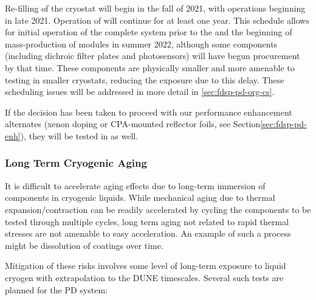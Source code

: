 Re-filling of the  cryostat will begin in the fall of 2021, with operations beginning in late 2021.  Operation of  will continue for at least one year.  This schedule allows for initial operation of the complete system prior to the   and the beginning of mass-production of  modules in summer 2022, although some components (including dichroic filter plates and photosensors) will have begun procurement by that time.  These components are physically smaller and more amenable to testing in smaller cryostats, reducing the exposure due to this delay.  These scheduling issues will be addressed in more detail in \ref{sec:fdsp-pd-org-cs}.

If the decision has been taken to proceed with our performance enhancement alternates (xenon doping or CPA-mounted reflector foils, see Section\ref{sec:fdsp-pd-enh}), they will be tested in  as well.

\subsubsection{Long Term Cryogenic Aging}
\label{sec:valid-longtermaging}

It is difficult to accelerate aging effects due to long-term immersion of components in cryogenic liquids.  While mechanical aging due to thermal expansion/contraction can be readily accelerated by cycling the components to be tested through multiple cycles, long term aging not related to rapid thermal stresses are not amenable to easy acceleration.  An example of such a process might be dissolution of  coatings over time.

Mitigation of these risks involves some level of long-term exposure to liquid cryogen with extrapolation to the DUNE timescales.  Several such tests are planned for the PD system:


